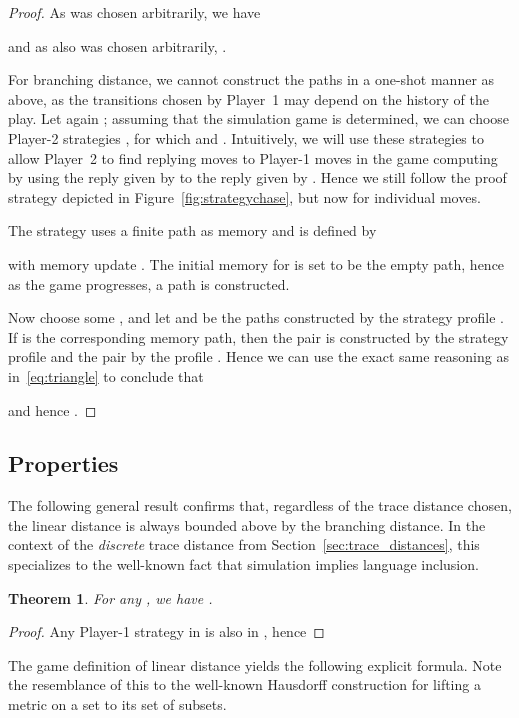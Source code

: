 \documentclass[copyright,creativecommons,sharealike]{eptcs}
\theoremstyle{plain}
\newtheorem{theorem}{Theorem}
\begin{document}
\begin{proof}
  As  was chosen arbitrarily,
  we have
  
  and as also  was chosen arbitrarily, .

  \smallskip For branching distance, we cannot construct the paths in a one-shot
  manner as above, as the transitions chosen by Player~1 may depend on
  the history of the play.  Let again ; assuming that the
  simulation game is determined, we can choose Player-2 strategies
  ,  for which  and
  .  Intuitively, we will use
  these strategies to allow Player~2 to find replying moves to
  Player-1 moves in the game computing  by using the
  reply given by  to the reply given by .  Hence we still follow the proof strategy depicted in
  Figure~\ref{fig:strategychase}, but now for individual moves.

  The strategy  uses a finite path  as memory and is defined by
  
  with memory update .  The initial memory for 
  is set to be the empty path, hence as the game progresses, a path
   is constructed.  

  Now choose some , and let
   and  be the paths
  constructed by the strategy profile .  If  is the corresponding memory
  path, then the pair  is constructed by the strategy
  profile  and the pair  by the profile .  Hence we can use the exact same reasoning as
  in~\eqref{eq:triangle} to conclude that
  
  and hence .
\end{proof}

\subsection{Properties}

The following general result confirms that, regardless of the trace
distance chosen, the linear distance is always bounded above by the
branching distance.  In the context of the \emph{discrete} trace
distance from Section~\ref{sec:trace_distances}, this specializes to
the well-known fact that simulation implies language inclusion.

\begin{theorem}
  \label{thm:bound}
  For any , we have .
\end{theorem}

\begin{proof}
  Any Player-1 strategy in  is also in , hence
  
\end{proof}

The game definition of linear distance yields the following explicit
formula.  Note the resemblance of this to the well-known Hausdorff
construction for lifting a metric on a set to its set of subsets.
\end{document}
